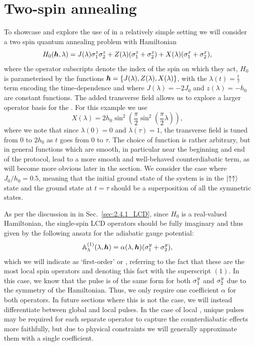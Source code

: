 \section{Two-spin annealing}\label{sec:5.1_2spin_annealing}

To showcase and explore the use of  in a relatively simple setting we will consider a two spin quantum annealing problem with Hamiltonian
\begin{equation}\label{eq:two_spin_hamiltonian}
H_0(\boldsymbol{h}, \lambda) = J(\lambda) \sigma^z_1 \sigma^z_2 + Z(\lambda) ( \sigma^z_{1} + \sigma^z_{2}) +  X(\lambda) (\sigma^x_{1} + \sigma^x_{2}),
\end{equation}
where the operator subscripts denote the index of the spin on which they act, $H_0$ is parameterised by the functions $\boldsymbol{h} = \{J(\lambda), Z(\lambda), X(\lambda)\}$, with the $\lambda(t) = \frac{t}{\tau}$ term encoding the time-dependence and where $J(\lambda) = -2J_0$ and $z(\lambda) = -h_0$ are constant functions. The added transverse field allows us to explore a larger operator basis for the . For this example we use
\begin{equation}\label{eq:lambda_func1}
X(\lambda) = 2 h_0 \sin^2\left(\frac{\pi}{2} \sin^2 \left( \frac{\pi}{2} \lambda \right) \right),
\end{equation}
where we note that since $\lambda(0) = 0$ and $\lambda(\tau) = 1$, the transverse field is tuned from $0$ to $2h_0$ as $t$ goes from $0$ to $\tau$. The choice of function is rather arbitrary, but in general functions which are smooth, in particular near the beginning and end of the protocol, lead to a more smooth and well-behaved counterdiabatic term, as will become more obvious later in the section. We consider the case where $J_0/h_0 = 0.5$, meaning that the initial ground state of the system is in the $\ket{\uparrow \uparrow}$ state and the ground state at $t = \tau$ should be a superposition of all the symmetric states.

As per the discussion in in Sec.~\ref{sec:2.4.1_LCD}, since $H_0$ is a real-valued Hamiltonian, the single-spin LCD operators should be fully imaginary and thus given by the following ansatz for the adiabatic gauge potential:
\begin{equation}\label{eq:LCD1st}
\mathbb{A}_{\lambda}^{(1)}(\lambda, \boldsymbol{h}) = \alpha(\lambda, \boldsymbol{h}) (\sigma^y_1 + \sigma^y_2),
\end{equation}
which we will indicate as `first-order' or  , referring to the fact that these are the most local spin operators and denoting this fact with the superscript $(1)$. In this case, we know that the  pulse is of the same form for both $\sigma^y_1$ and $\sigma^y_2$ due to the symmetry of the Hamiltonian. Thus, we only require one coefficient $\alpha$ for both operators. In future sections where this is not the case, we will instead differentiate between global and local  pulses. In the case of local , unique pulses may be required for each separate operator to capture the counterdiabatic effects more faithfully, but due to physical constraints we will generally approximate them with a single coefficient.


